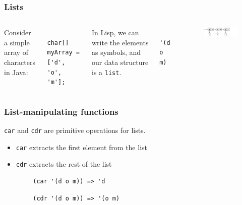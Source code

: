 \documentclass{beamer}
\begin{document}
\begin{frame}[fragile] %
	\frametitle{Lists}
	
	
	\begin{columns}[c] 
	Consider a simple array of characters in Java:
	
	\begin{example}
		\begin{verbatim}
		char[] myArray = ['d', 'o', 'm'];
		\end{verbatim}
	\end{example}
	
	
	In Lisp, we can write the elements as symbols, and our data structure is a \texttt{list}.
	
	\begin{example}
		\begin{verbatim}
		'(d o m)
		\end{verbatim}
	\end{example}
	
	\begin{figure}
		\includegraphics[width=1.2\linewidth]{../img/chain}
		 
	\end{figure}
	
	
	\end{columns}
	
\end{frame}

\begin{frame}[fragile] %
	\frametitle{List-manipulating functions}
	
	\texttt{car} and \texttt{cdr} are primitive operations for lists.
	
	\begin{itemize}
		\item \texttt{car} extracts the first element from the list
		\item \texttt{cdr} extracts the rest of the list
	\end{itemize}
	
	
	\begin{example}[car]
		\begin{verbatim}
		(car '(d o m)) => 'd
		\end{verbatim}
	\end{example}
	
	\begin{example}[cdr]
		\begin{verbatim}
		(cdr '(d o m)) => '(o m)
		\end{verbatim}
	\end{example}
	
\end{frame}
\end{document}
